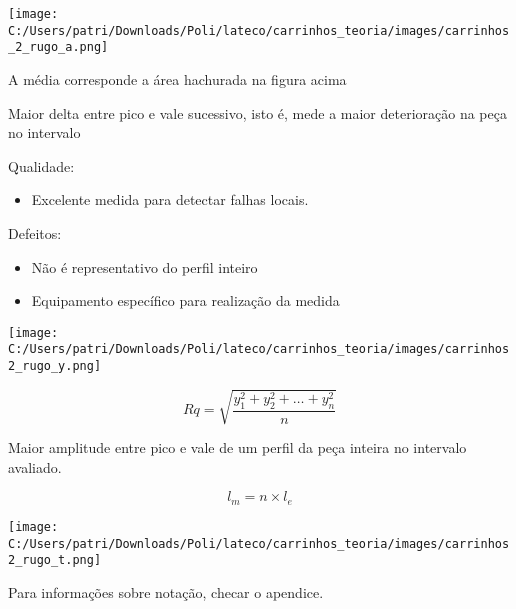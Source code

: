 \begin{center}
	\texttt{[image: C:/Users/patri/Downloads/Poli/lateco/carrinhos\_teoria/images/carrinhos\_2\_rugo\_a.png]}
\end{center}

A média corresponde a área hachurada na figura acima

\begin{namedtheorem}
  Maior delta entre pico e vale sucessivo, isto é, mede a maior deterioração na peça no intervalo
\end{namedtheorem}

Qualidade:
\begin{itemize}
	\item Excelente medida para detectar falhas locais.
\end{itemize}

Defeitos:
\begin{itemize}
	\item Não é representativo do perfil inteiro
	\item Equipamento específico para realização da medida
\end{itemize}

\begin{center}
\texttt{[image: C:/Users/patri/Downloads/Poli/lateco/carrinhos\_teoria/images/carrinhos2\_rugo\_y.png]}
\end{center}

\begin{namedtheorem}
  \[Rq = \sqrt{\frac{y_1^2 + y_2^2 + \dots + y_n^2}{n}}\]
\end{namedtheorem}

\begin{namedtheorem}
  Maior amplitude entre pico e vale de um perfil da peça inteira no intervalo avaliado.
\end{namedtheorem}

$$l_m = n\times l_e$$

\begin{center}
	\texttt{[image: C:/Users/patri/Downloads/Poli/lateco/carrinhos\_teoria/images/carrinhos2\_rugo\_t.png]}
\end{center}

Para informações sobre notação, checar o apendice.

